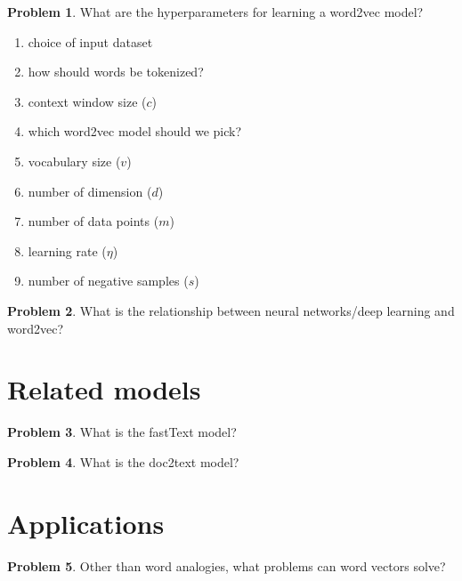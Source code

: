 \documentclass[10pt]{article}
\theoremstyle{definition}
\newtheorem{problem}{Problem}
\begin{document}
\newpage
\begin{problem}
    What are the hyperparameters for learning a word2vec model?
    \begin{enumerate}
        \item choice of input dataset
            \vspace{3in}
        \item how should words be tokenized?
            \vspace{3in}
        \item context window size ($c$)
            \vspace{3in}
        \item which word2vec model should we pick?
            \vspace{3in}
        \item vocabulary size ($v$)
            \vspace{3in}
        \item number of dimension ($d$)
            \vspace{3in}
        \item number of data points ($m$)
            \vspace{3in}
        \item learning rate ($\eta$)
            \vspace{3in}
        \item number of negative samples ($s$)
            \vspace{3in}
    \end{enumerate}
\end{problem}

\newpage
\begin{problem}
    What is the relationship between neural networks/deep learning and word2vec?
\end{problem}

\newpage
\section{Related models}
\begin{problem}
    What is the fastText model?
\end{problem}

\newpage
\begin{problem}
    What is the doc2text model?
\end{problem}

\newpage
\section{Applications}
\begin{problem}
    Other than word analogies, what problems can word vectors solve?
\end{problem}
\end{document}
